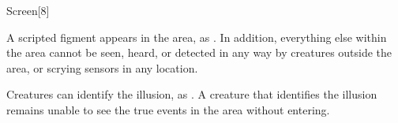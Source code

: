 \begin{spellsection}{Screen}[8]
    \begin{spellheader}
    \end{spellheader}
    \begin{spellcontent}
        \begin{spelltargetinginfo}
        \end{spelltargetinginfo}
        \begin{spelleffects}

            \spellline
            \spelleffect A scripted figment appears in the area, as . In addition, everything else within the area cannot be seen, heard, or detected in any way by creatures outside the area, or scrying sensors in any location.
            \spelldur \durext
        \end{spelleffects}
    \end{spellcontent}
    \begin{spellfooter}
        \spellnotes Creatures can identify the illusion, as . A creature that identifies the illusion remains unable to see the true events in the area without entering.
    \end{spellfooter}
\end{spellsection}

